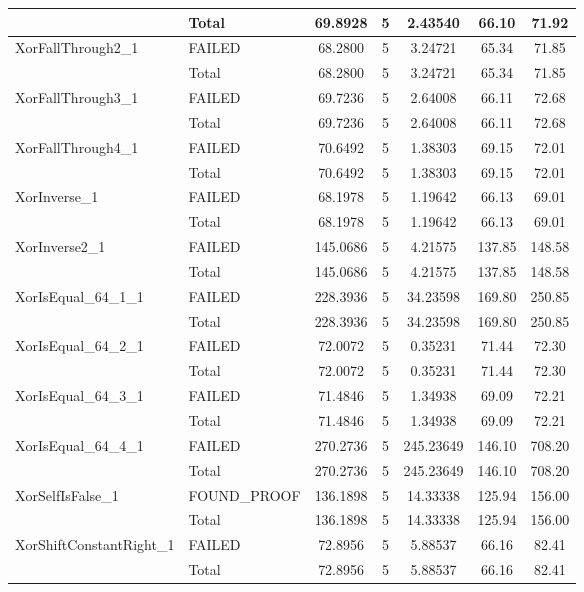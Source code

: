 \begin{appendices}
\begin{longtable}{L{0.25\textwidth} L{0.2\textwidth}  c  c  c  c  c }
    & Total & 69.8928 & 5 & 2.43540 & 66.10 & 71.92 \\ \midrule 
    XorFallThrough2\_1 & FAILED & 68.2800 & 5 & 3.24721 & 65.34 & 71.85 \\ \midrule 
    & Total & 68.2800 & 5 & 3.24721 & 65.34 & 71.85 \\ \midrule 
    XorFallThrough3\_1 & FAILED & 69.7236 & 5 & 2.64008 & 66.11 & 72.68 \\ \midrule 
    & Total & 69.7236 & 5 & 2.64008 & 66.11 & 72.68 \\ \midrule 
    XorFallThrough4\_1 & FAILED & 70.6492 & 5 & 1.38303 & 69.15 & 72.01 \\ \midrule 
    & Total & 70.6492 & 5 & 1.38303 & 69.15 & 72.01 \\ \midrule 
    XorInverse\_1 & FAILED & 68.1978 & 5 & 1.19642 & 66.13 & 69.01 \\ \midrule 
    & Total & 68.1978 & 5 & 1.19642 & 66.13 & 69.01 \\ \midrule 
    XorInverse2\_1 & FAILED & 145.0686 & 5 & 4.21575 & 137.85 & 148.58 \\ \midrule 
    & Total & 145.0686 & 5 & 4.21575 & 137.85 & 148.58 \\ \midrule 
    XorIsEqual\_64\_1\_1 & FAILED & 228.3936 & 5 & 34.23598 & 169.80 & 250.85 \\ \midrule 
    & Total & 228.3936 & 5 & 34.23598 & 169.80 & 250.85 \\ \midrule 
    XorIsEqual\_64\_2\_1 & FAILED & 72.0072 & 5 & 0.35231 & 71.44 & 72.30 \\ \midrule 
    & Total & 72.0072 & 5 & 0.35231 & 71.44 & 72.30 \\ \midrule 
    XorIsEqual\_64\_3\_1 & FAILED & 71.4846 & 5 & 1.34938 & 69.09 & 72.21 \\ \midrule 
    & Total & 71.4846 & 5 & 1.34938 & 69.09 & 72.21 \\ \midrule 
    XorIsEqual\_64\_4\_1 & FAILED & 270.2736 & 5 & 245.23649 & 146.10 & 708.20 \\ \midrule 
    & Total & 270.2736 & 5 & 245.23649 & 146.10 & 708.20 \\ \midrule 
    XorSelfIsFalse\_1 & FOUND\_PROOF & 136.1898 & 5 & 14.33338 & 125.94 & 156.00 \\ \midrule 
    & Total & 136.1898 & 5 & 14.33338 & 125.94 & 156.00 \\ \midrule 
    XorShiftConstantRight\_1 & FAILED & 72.8956 & 5 & 5.88537 & 66.16 & 82.41 \\ \midrule 
    & Total & 72.8956 & 5 & 5.88537 & 66.16 & 82.41 \\ \midrule 

\end{longtable}
\end{appendices}
